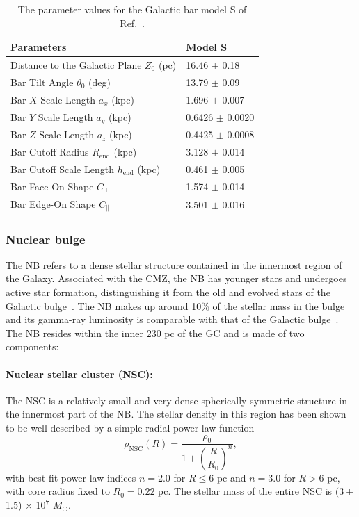 \documentclass[doublespace,draft,nopageskip]{VTthesis} %
\begin{document}
\begin{table}[t!]
  \caption{\label{tab:modelS} The parameter values for the Galactic bar model S of Ref.~\cite{Freudenreich:1997bx}.}
    \begin{tabular}{ll}
      Parameters & Model S \\ \hline
      Distance to the Galactic Plane $Z_0$ (pc) & 16.46 $\pm$ 0.18\\
      Bar Tilt Angle $\theta_0$ (deg) & 13.79 $\pm$ 0.09\\
      Bar $X$ Scale Length $a_x$ (kpc) & 1.696 $\pm$ 0.007 \\
      Bar $Y$ Scale Length $a_y$ (kpc) & 0.6426 $\pm$ 0.0020 \\
      Bar $Z$ Scale Length $a_z$ (kpc) & 0.4425 $\pm$ 0.0008 \\
      Bar Cutoff Radius $R_{\text{end}}$ (kpc) & 3.128 $\pm$ 0.014 \\
      Bar Cutoff Scale Length $h_{\text{end}}$ (kpc) & 0.461 $\pm$ 0.005 \\
      Bar Face-On Shape $C_\perp$ & 1.574 $\pm$ 0.014 \\
      Bar Edge-On Shape $C_\parallel$ & 3.501 $\pm$ 0.016
    \end{tabular}
\end{table}

\subsubsection{Nuclear bulge}\label{sec:nb}

The NB refers to a dense stellar structure contained in the innermost region of the Galaxy. Associated with the CMZ, the NB has younger stars and undergoes active star formation, distinguishing it from the old and evolved stars of the Galactic bulge~\cite{Launhardt:2002tx}. The NB makes up around 10\% of the stellar mass in the bulge and its gamma-ray luminosity is comparable with that of the Galactic bulge~\cite{Macias:2016nev,Bartels:2017vsx}. The NB resides within the inner 230 pc of the GC and is made of two components:

\paragraph{Nuclear stellar cluster (NSC):} The NSC is a relatively small and very dense spherically symmetric structure in the innermost part of the NB. The stellar density in this region has been shown~\cite{Launhardt:2002tx} to be well described by a simple radial power-law function
\begin{equation}\label{eq:NSC}
  \rho_{\text{NSC}}(R)=\dfrac{\rho_0}{1+\left(\dfrac{R}{R_0}\right)^{n}},
\end{equation}
with best-fit power-law indices $n = 2.0$ for $R \leq 6$ pc and $n = 3.0$ for $R > 6$ pc, with core radius fixed to $R_0 = 0.22$ pc. The stellar mass of the entire NSC is $(3\pm$ 1.5) $\times$ 10$^7$ $M_\odot$.
\end{document}
